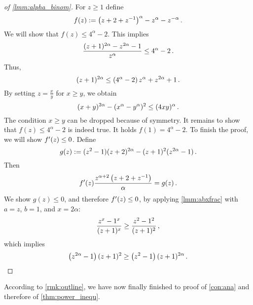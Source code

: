 %
\begin{proof}[of \autoref{lmm:alpha_binom}]
	For $z\geq1$ define
	\begin{equation*}
		f(z) := \left( z+2+z^{-1} \right)^{\alpha}-z^\alpha-z^{-\alpha}
		\, .
	\end{equation*}
	We will show that $f(z) \leq 4^\alpha-2$.
	This implies
	\begin{equation*}
		\frac{(z+1)^{2\alpha}-z^{2\alpha}-1}{z^\alpha} \leq  4^\alpha-2
		\, .
	\end{equation*}
	Thus,
	\begin{equation*}
		(z+1)^{2\alpha} \leq \left(  4^\alpha-2 \right) z^\alpha+z^{2\alpha}+1
		\, .
	\end{equation*}
	By setting $z = \frac xy$  for $x\geq y$, we obtain
	\begin{equation*}
		(x+y)^{2\alpha}-(x^\alpha-y^\alpha)^2 \leq (4xy)^\alpha
		\, .
	\end{equation*}
	The condition $x\geq y$ can be dropped because of symmetry.
	It remains to show that $f(z) \leq 4^\alpha-2$ is indeed true.
	It holds $f(1) = 4^\alpha-2$. To finish the proof, we will show $f^\prime(z) \leq 0$. Define
	\begin{equation*}
		g(z) := (z^2-1)(z+2)^{2\alpha}-(z+1)^2(z^{2\alpha}-1)
		\, .
	\end{equation*}
	Then
	\begin{equation*}
		f^\prime(z) \frac{z^{\alpha+2}\left( z+2+z^{-1} \right)}{\alpha} = g(z)
		\, .
	\end{equation*}
	We show $g(z) \leq 0$, and therefore $f^\prime(z)\leq0$, by applying \autoref{lmm:abxfrac} with $a=z$, $b=1$, and $x=2\alpha$:
	\begin{equation*}
		\frac{z^{x}-1^{x}}{(z+1)^{x}} \geq \frac{z^{2}-1^{2}}{(z+1)^{2}}
		\, ,
	\end{equation*}
	which implies
	\begin{equation*}
		\left( z^{2\alpha}-1 \right)(z+1)^{2} \geq \left( z^{2}-1 \right)(z+1)^{2\alpha}
		\, .
	\end{equation*}
\end{proof}
%
According to \autoref{rmk:outline}, we have now finally finished to proof of \autoref{con:ana} and therefore of \autoref{thm:power_inequ}.
%
%
%
%
%